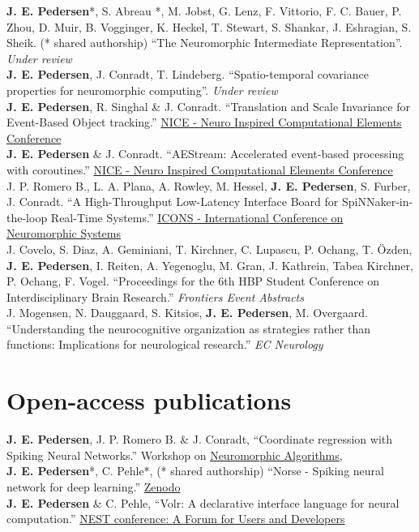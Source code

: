 \documentclass[11pt, a4paper]{article}
\newcommand{\years}[1]{\marginnote{\scriptsize #1}}
\begin{document}
\years{}\textbf{J. E. Pedersen}*, S. Abreau *, M. Jobst, G. Lenz, F. Vittorio, F. C. Bauer, P. Zhou, D. Muir, B. Vogginger, K. Heckel,
T. Stewart, S. Shankar, J. Eshragian, S. Sheik. (* shared authorship) ``The Neuromorphic Intermediate Representation''. \emph{Under review} \\
\years{}\textbf{J. E. Pedersen}, J. Conradt, T. Lindeberg. ``Spatio-temporal covariance properties for neuromorphic computing''. \emph{Under review} \\
\years{2023} \textbf{J. E. Pedersen}, R. Singhal \& J. Conradt.
``Translation and Scale Invariance for Event-Based Object tracking.''
\href{https://dl.acm.org/conference/nice}{NICE - Neuro Inspired Computational Elements Conference} \\
\years{2023} \textbf{J. E. Pedersen} \& J. Conradt.
``AEStream: Accelerated event-based processing with coroutines.''
\href{https://dl.acm.org/conference/nice}{NICE - Neuro Inspired Computational Elements Conference} \\
\years{2023} J. P. Romero B., L. A. Plana, A. Rowley, M. Hessel, \textbf{J. E. Pedersen}, S. Furber, J. Conradt.
``A High-Throughput Low-Latency Interface Board for SpiNNaker-in-the-loop Real-Time Systems.''
\href{https://icons.ornl.gov/}{ICONS - International Conference on Neuromorphic Systems} \\
\years{2022} J. Covelo, S. Diaz, A. Geminiani, T. Kirchner, C. Lupascu,
P. Ochang, T. Özden, \textbf{J. E. Pedersen}, I. Reiten, A. Yegenoglu, M. Gran, J. Kathrein, Tabea Kirchner, P. Ochang, F. Vogel.
``Proceedings for the 6th HBP Student Conference on Interdisciplinary Brain Research.''
\emph{Frontiers Event Abstracts} \\
\years{2018} J. Mogensen, N. Dauggaard, S. Kitsios, \textbf{J. E. Pedersen}, M. Overgaard.
``Understanding the neurocognitive organization as strategies rather than functions: Implications for neurological research.''
\emph{EC Neurology}

\section*{Open-access publications}
\years{2022} \textbf{J. E. Pedersen}, J. P. Romero B. \& J. Conradt, 
``Coordinate regression with Spiking Neural Networks.''
Workshop on \href{https://neal2022.tetzlab.com/}{Neuromorphic Algorithms}, \\
\years{2020} \textbf{J. E. Pedersen}*, C. Pehle*, (* shared authorship) 
``Norse - Spiking neural network for deep learning.''
\href{https://zenodo.org/record/4422025}{Zenodo}
\\
\years{2018} \textbf{J. E. Pedersen} \& C. Pehle, 
``Volr: A declarative interface language for neural computation.''
\href{https://indico-jsc.fz-juelich.de/event/71/}{NEST conference: A Forum for Users and Developers}\\
\end{document}
